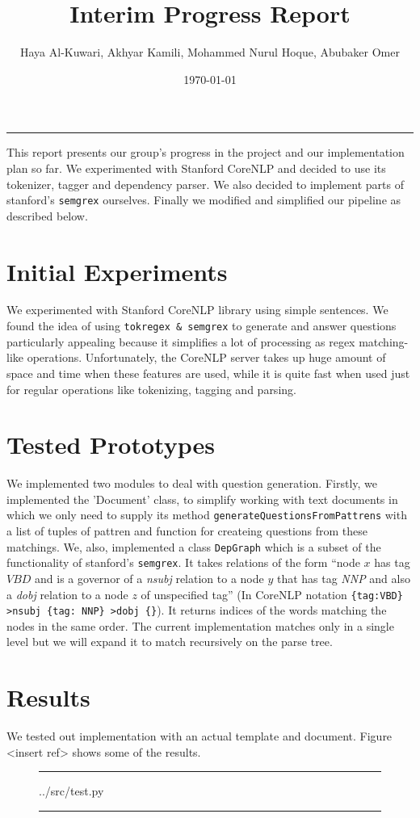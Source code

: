 \documentclass{article}
\title{Interim Progress Report}
\author{Haya Al-Kuwari, Akhyar Kamili, Mohammed Nurul Hoque, Abubaker Omer}
\date{\today}
\newcommand{\code}[1] {
	\noindent\rule{\textwidth}{0.4pt}
	#1
	\vspace{-0.3em}
	\par\noindent\rule{\textwidth}{0.4pt}
	\vspace{-1.7\baselineskip}
	
}
\begin{document}
    \maketitle
    \noindent\rule{\textwidth}{1pt}
    This report presents our group's progress in the project and our implementation plan so far. We
    experimented with Stanford CoreNLP and decided to use its tokenizer, tagger and dependency
    parser. We also decided to implement parts of stanford's \texttt{semgrex} ourselves. Finally we
    modified and simplified our pipeline as described below.

    \section{Initial Experiments}
    We experimented with Stanford CoreNLP library using simple sentences. We found the idea of using
    \texttt{tokregex \& semgrex} to generate and answer questions particularly appealing because it
    simplifies a lot of processing as regex matching-like operations. Unfortunately, the CoreNLP
    server takes up huge amount of space and time when these features are used, while it is quite
    fast when used just for regular operations like tokenizing, tagging and parsing.

    \section{Tested Prototypes}
    We implemented two modules to deal with question generation. Firstly, we implemented the
    'Document' class, to simplify working with text documents in which we only need to supply its
    method \texttt{generateQuestionsFromPattrens} with a list of tuples of pattren and function for
    createing questions from these matchings. We, also, implemented a class \texttt{DepGraph} which
    is a subset of the functionality of stanford's \texttt{semgrex}. It takes relations of the form
    ``node $x$ has tag $VBD$ and is a governor of a \textit{nsubj} relation to a node $y$ that has
    tag \textit{NNP} and also a \textit{dobj} relation to a node $z$ of unspecified tag'' (In
    CoreNLP notation \texttt{\{tag:VBD\} >nsubj \{tag: NNP\} >dobj \{\}}). It returns indices of the
    words matching the nodes in the same order. The current implementation matches only in a single
    level but we will expand it to match recursively on the parse tree.

    \section{Results}
    We tested out implementation with an actual template and document. Figure <insert ref> shows some of
    the results.

    \begin{figure}
        \code{../src/test.py}
    \end{figure}
    
\end{document}
